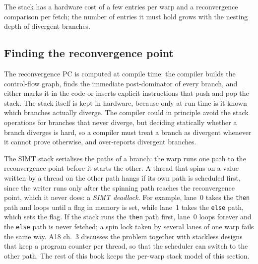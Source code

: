 \documentclass[../main.tex]{subfiles}
\begin{document}
The stack has a hardware cost of a few entries per warp and a
reconvergence comparison per fetch; the number of entries it must
hold grows with the nesting depth of divergent branches.

\subsection{Finding the reconvergence point}

The reconvergence PC is computed at compile time: the compiler builds
the control-flow graph, finds the immediate post-dominator of every
branch, and either marks it in the code or inserts explicit
instructions that push and pop the stack.  The stack itself is kept in hardware, because only
at run time is it known which branches actually diverge.  The compiler
could in principle avoid the stack operations for branches that never
diverge, but deciding statically whether a branch diverges is hard, so
a compiler must treat a branch as divergent whenever it cannot prove
otherwise, and over-reports divergent branches.

\begin{note}
  The SIMT stack serialises the paths of a branch: the warp runs one
  path to the reconvergence point before it starts the other.  A thread
  that spins on a value written by a thread on the other path hangs if
  its own path is scheduled first, since the writer runs only after the
  spinning path reaches the reconvergence point, which it never does:
  a \emph{SIMT deadlock}.  For example, lane~0 takes the \texttt{then}
  path and loops until a flag in memory is set, while lane~1 takes the
  \texttt{else} path, which sets the flag.  If the stack runs the
  \texttt{then} path first, lane~0 loops forever and the \texttt{else}
  path is never fetched; a spin lock taken by several lanes of one warp
  fails the same way.  A18 ch.~3 discusses the problem together with
  stackless designs that keep a program counter per thread, so that the
  scheduler can switch to the other path.  The rest of this book keeps the
  per-warp stack model of this section.
\end{note}
\end{document}
